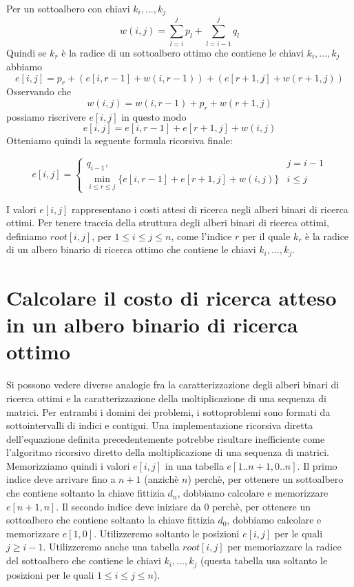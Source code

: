 Per un sottoalbero con chiavi $k_i, ..., k_j$
$$
  w(i , j) = \sum_{l = i}^{j} p_l + \sum_{l = i - 1}^{j} q_l
$$
Quindi se $k_r$ è la radice di un sottoalbero ottimo che contiene le
chiavi $k_i, ..., k_j$ abbiamo
$$
  e[i,j] = p_r + (e[i, r-1] + w(i, r-1)) + (e[r+1, j] + w(r+1, j))
$$
Osservando che
$$
  w(i,j) = w(i, r-1) + p_r + w(r+1, j)
$$
possiamo riscrivere $e[i,j]$ in questo modo
$$
  e[i,j] = e[i, r-1] + e[r+1, j] + w(i,j)
$$
Otteniamo quindi la seguente formula ricorsiva finale:

\begin{equation*}
  e[i,j] =
  \begin{cases}
    q_{i-1},                                                & j = i-1 \\
    \min_{i \le r \le j} \{e[i, r-1] + e[r+1, j] + w(i,j)\} & i \le j
  \end{cases}
\end{equation*}

I valori $e[i,j]$ rappresentano i costi attesi di ricerca negli alberi
binari di ricerca ottimi. Per tenere traccia della struttura degli
alberi binari di ricerca ottimi, definiamo $root[i,j]$, per
$1 \le i \le j \le n$, come l'indice $r$ per il quale $k_r$ è la
radice di un albero binario di ricerca ottimo che contiene le chiavi
$k_i , ..., k_j$.

\section{Calcolare il costo di ricerca atteso in un albero binario di ricerca ottimo}

Si possono vedere diverse analogie fra la caratterizzazione degli alberi
binari di ricerca ottimi e la caratterizzazione della moltiplicazione di
una sequenza di matrici. Per entrambi i domini dei problemi, i
sottoproblemi sono formati da sottointervalli di indici e contigui. Una
implementazione ricorsiva diretta dell'equazione definita
precedentemente potrebbe risultare inefficiente come l'algoritmo
ricorsivo diretto della moltiplicazione di una sequenza di matrici.\\
Memorizziamo quindi i valori $e[i,j]$ in una tabella
$e[1..n +1, 0..n]$. Il primo indice deve arrivare fino a $n+1$
(anzichè $n$) perchè, per ottenere un sottoalbero che contiene
soltanto la chiave fittizia $d_n$, dobbiamo calcolare e memorizzare
$e[n+1,n]$. Il secondo indice deve iniziare da 0 perchè, per ottenere
un sottoalbero che contiene soltanto la chiave fittizia $d_0$,
dobbiamo calcolare e memorizzare $e[1,0]$. Utilizzeremo soltanto le
posizioni $e[i,j]$ per le quali $j \ge i-1$. Utilizzeremo anche una
tabella $root[i,j]$ per memoriazzare la radice del sottoalbero che
contiene le chiavi $k_i, ..., k_j$ (questa tabella usa soltanto le
posizioni per le quali $1 \le i \le j \le n$).\\

